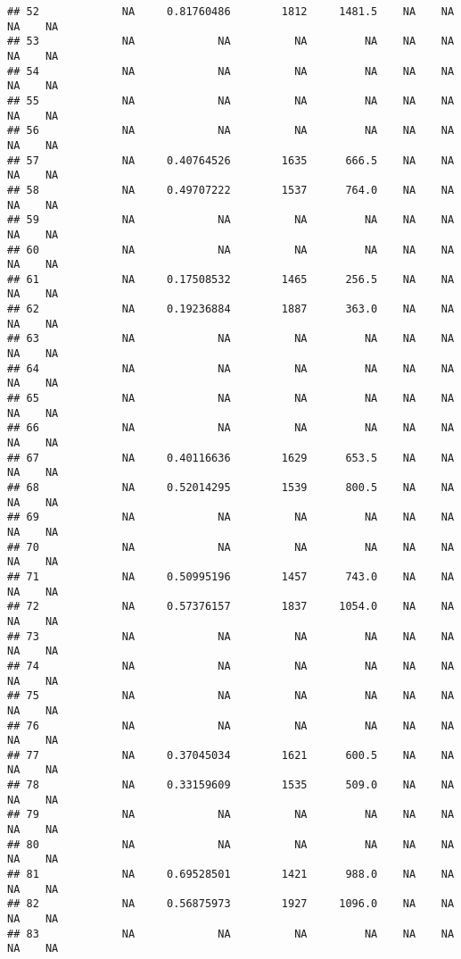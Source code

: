 \documentclass[]{article}
\begin{document}
\begin{verbatim}
## 52             NA     0.81760486        1812     1481.5    NA    NA    NA    NA
## 53             NA             NA          NA         NA    NA    NA    NA    NA
## 54             NA             NA          NA         NA    NA    NA    NA    NA
## 55             NA             NA          NA         NA    NA    NA    NA    NA
## 56             NA             NA          NA         NA    NA    NA    NA    NA
## 57             NA     0.40764526        1635      666.5    NA    NA    NA    NA
## 58             NA     0.49707222        1537      764.0    NA    NA    NA    NA
## 59             NA             NA          NA         NA    NA    NA    NA    NA
## 60             NA             NA          NA         NA    NA    NA    NA    NA
## 61             NA     0.17508532        1465      256.5    NA    NA    NA    NA
## 62             NA     0.19236884        1887      363.0    NA    NA    NA    NA
## 63             NA             NA          NA         NA    NA    NA    NA    NA
## 64             NA             NA          NA         NA    NA    NA    NA    NA
## 65             NA             NA          NA         NA    NA    NA    NA    NA
## 66             NA             NA          NA         NA    NA    NA    NA    NA
## 67             NA     0.40116636        1629      653.5    NA    NA    NA    NA
## 68             NA     0.52014295        1539      800.5    NA    NA    NA    NA
## 69             NA             NA          NA         NA    NA    NA    NA    NA
## 70             NA             NA          NA         NA    NA    NA    NA    NA
## 71             NA     0.50995196        1457      743.0    NA    NA    NA    NA
## 72             NA     0.57376157        1837     1054.0    NA    NA    NA    NA
## 73             NA             NA          NA         NA    NA    NA    NA    NA
## 74             NA             NA          NA         NA    NA    NA    NA    NA
## 75             NA             NA          NA         NA    NA    NA    NA    NA
## 76             NA             NA          NA         NA    NA    NA    NA    NA
## 77             NA     0.37045034        1621      600.5    NA    NA    NA    NA
## 78             NA     0.33159609        1535      509.0    NA    NA    NA    NA
## 79             NA             NA          NA         NA    NA    NA    NA    NA
## 80             NA             NA          NA         NA    NA    NA    NA    NA
## 81             NA     0.69528501        1421      988.0    NA    NA    NA    NA
## 82             NA     0.56875973        1927     1096.0    NA    NA    NA    NA
## 83             NA             NA          NA         NA    NA    NA    NA    NA

\end{verbatim}
\end{document}
